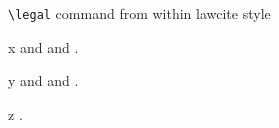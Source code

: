 			


\usepackage[
				bookmarks,
            colorlinks=true,        
            allcolors = black,  
            citecolor=blue, 
            hyperindex=false,       
]{hyperref}


\newcommand\cmd[1]{\texttt{\textbackslash #1}}




\cmd{legal} command from within lawcite style

x  and  and .

y  and  and .

z \parencite{reese,aristotle:anima}.

\printbibliography%
 
